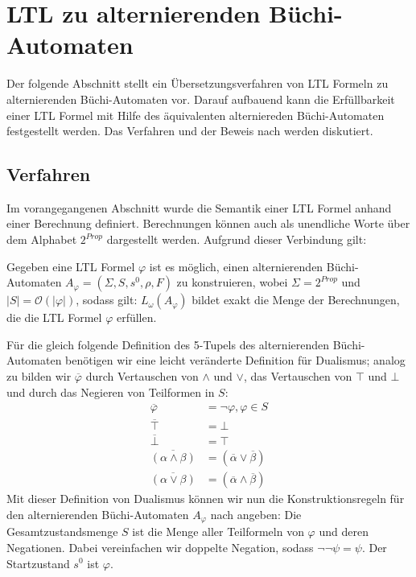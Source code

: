 \section{LTL zu alternierenden Büchi-Automaten}

Der folgende Abschnitt stellt ein Übersetzungsverfahren von LTL Formeln zu alternierenden Büchi-Automaten vor. Darauf aufbauend kann die Erfüllbarkeit einer LTL Formel mit Hilfe des äquivalenten alterniereden Büchi-Automaten festgestellt werden. Das Verfahren und der Beweis nach \cite{vardi+96} werden diskutiert.


\subsection{Verfahren}
\label{subsection:verfahren}
Im vorangegangenen Abschnitt wurde die Semantik einer LTL Formel anhand einer Berechnung definiert. Berechnungen können auch als unendliche Worte über dem Alphabet $2^{Prop}$ dargestellt werden\cite{vardi+96}. Aufgrund dieser Verbindung gilt:
\begin{satz}\cite{vardi+96}
\label{LTL->ABA}
    Gegeben eine LTL Formel $\varphi$ ist es möglich, einen alternierenden Büchi-Automaten $A_\varphi = (\Sigma, S, s^0, \rho, F)$ zu konstruieren, wobei $\Sigma = 2^{Prop}$ und $|S| = \mathcal{O}(|\varphi|)$, sodass gilt: $L_\omega(A_\varphi)$ bildet exakt die Menge der Berechnungen, die die LTL Formel $\varphi$ erfüllen.
\end{satz}
Für die gleich folgende Definition des 5-Tupels des alternierenden Büchi-Automaten benötigen wir eine leicht veränderte Definition für Dualismus; analog zu \cite{vardi+96} bilden wir $\overline{\varphi}$ durch Vertauschen von $\land$ und $\lor$, das Vertauschen von $\top$ und $\bot$ und durch das Negieren von Teilformen in $S$:
\begin{equation}
\label{aba-zu-ltl:dualismus}
\begin{split}
    \overline{\varphi} &= \lnot\varphi, \varphi \in S\\
    \overline{\top} &= \bot\\
    \overline{\bot} &= \top\\
    \overline{(\alpha \land \beta)} &= (\overline{\alpha} \lor \overline{\beta})\\
    \overline{(\alpha \lor \beta)} &= (\overline{\alpha} \land \overline{\beta})
\end{split}
\end{equation}
Mit dieser Definition von Dualismus können wir nun die Konstruktionsregeln für den alternierenden Büchi-Automaten $A_\varphi$ nach \cite{vardi+96} angeben: Die Gesamtzustandsmenge $S$ ist die Menge aller Teilformeln von $\varphi$ und deren Negationen. Dabei vereinfachen wir doppelte Negation, sodass $\lnot\lnot\psi = \psi$. Der Startzustand $s^0$ ist $\varphi$. 
